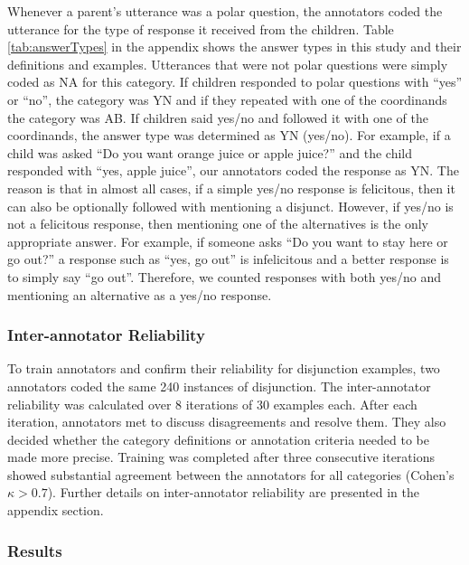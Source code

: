 \documentclass[floatsintext,man]{apa6}
\theoremstyle{definition}
\theoremstyle{definition}
\theoremstyle{definition}
\theoremstyle{remark}
\begin{document}
Whenever a parent's utterance was a polar question, the annotators coded
the utterance for the type of response it received from the children.
Table \ref{tab:answerTypes} in the appendix shows the answer types in
this study and their definitions and examples. Utterances that were not
polar questions were simply coded as NA for this category. If children
responded to polar questions with \enquote{yes} or \enquote{no}, the
category was YN and if they repeated with one of the coordinands the
category was AB. If children said yes/no and followed it with one of the
coordinands, the answer type was determined as YN (yes/no). For example,
if a child was asked \enquote{Do you want orange juice or apple juice?}
and the child responded with \enquote{yes, apple juice}, our annotators
coded the response as YN. The reason is that in almost all cases, if a
simple yes/no response is felicitous, then it can also be optionally
followed with mentioning a disjunct. However, if yes/no is not a
felicitous response, then mentioning one of the alternatives is the only
appropriate answer. For example, if someone asks \enquote{Do you want to
stay here or go out?} a response such as \enquote{yes, go out} is
infelicitous and a better response is to simply say \enquote{go out}.
Therefore, we counted responses with both yes/no and mentioning an
alternative as a yes/no response.

\subsubsection{Inter-annotator
Reliability}\label{inter-annotator-reliability}

To train annotators and confirm their reliability for disjunction
examples, two annotators coded the same 240 instances of disjunction.
The inter-annotator reliability was calculated over 8 iterations of 30
examples each. After each iteration, annotators met to discuss
disagreements and resolve them. They also decided whether the category
definitions or annotation criteria needed to be made more precise.
Training was completed after three consecutive iterations showed
substantial agreement between the annotators for all categories (Cohen's
\(\kappa > 0.7\)). Further details on inter-annotator reliability are
presented in the appendix section.

\subsubsection{Results}\label{results}
\end{document}
